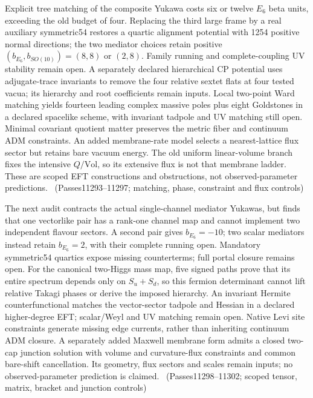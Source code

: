 Explicit tree matching of the composite Yukawa costs six or twelve $E_6$
beta units, exceeding the old budget of four. Replacing the third large frame
by a real auxiliary symmetric54 restores a quartic alignment potential with
1254 positive normal directions; the two mediator choices retain positive
$(b_{E_6},b_{SO(10)})=(8,8)$ or $(2,8)$. Family running and complete-coupling
UV stability remain open. A separately declared hierarchical CP potential
uses adjugate-trace invariants to remove the four relative sextet flats at four
tested vacua; its hierarchy and root coefficients remain inputs. Local two-point
Ward matching yields fourteen leading complex massive poles plus eight
Goldstones in a declared spacelike scheme, with invariant tadpole and UV
matching still open. Minimal covariant quotient matter preserves the metric
fiber and continuum ADM constraints. An added membrane-rate model selects a
nearest-lattice flux sector but retains bare vacuum energy. The old uniform
linear-volume branch fixes the intensive $Q/\mathrm{Vol}$, so its extensive
flux is not that membrane ladder. These are scoped EFT constructions and
obstructions, not observed-parameter predictions.
\tierC\ (Passes11293--11297; matching, phase, constraint and flux controls)

The next audit contracts the actual single-channel mediator Yukawas, but
finds that one vectorlike pair has a rank-one channel map and cannot implement
two independent flavour sectors. A second pair gives $b_{E_6}=-10$; two scalar
mediators instead retain $b_{E_6}=2$, with their complete running open.
Mandatory symmetric54 quartics expose missing counterterms; full portal
closure remains open. For the canonical two-Higgs mass map, five signed paths
prove that its entire spectrum depends only on $S_u+S_d$, so this fermion
determinant cannot lift relative Takagi phases or derive the imposed hierarchy.
An invariant Hermite counterfunctional matches the vector-sector tadpole and
Hessian in a declared higher-degree EFT; scalar/Weyl and UV matching remain
open. Native Levi site constraints generate missing edge currents, rather
than inheriting continuum ADM closure. A separately added Maxwell membrane
form admits a closed two-cap junction solution with volume and curvature-flux
constraints and common bare-shift cancellation. Its geometry, flux sectors
and scales remain inputs; no observed-parameter prediction is claimed.
\tierC\ (Passes11298--11302; scoped tensor, matrix, bracket and junction controls)

